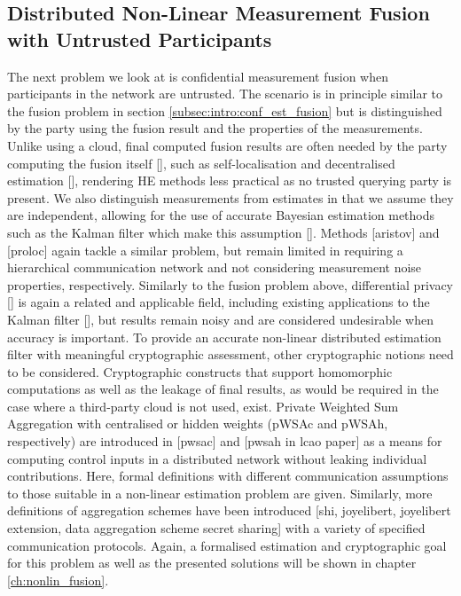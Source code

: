 % 
% 

\subsection{Distributed Non-Linear Measurement Fusion with Untrusted Participants}\label{subsec:intro:conf_nonlin_measurements}
The next problem we look at is confidential measurement fusion when participants in the network are untrusted. The scenario is in principle similar to the fusion problem in section \ref{subsec:intro:conf_est_fusion} but is distinguished by the party using the fusion result and the properties of the measurements. Unlike using a cloud, final computed fusion results are often needed by the party computing the fusion itself [], such as self-localisation and decentralised estimation [], rendering HE methods less practical as no trusted querying party is present. We also distinguish measurements from estimates in that we assume they are independent, allowing for the use of accurate Bayesian estimation methods such as the Kalman filter which make this assumption []. Methods [aristov] and [proloc] again tackle a similar problem, but remain limited in requiring a hierarchical communication network and not considering measurement noise properties, respectively. Similarly to the fusion problem above, differential privacy [] is again a related and applicable field, including existing applications to the Kalman filter [], but results remain noisy and are considered undesirable when accuracy is important. To provide an accurate non-linear distributed estimation filter with meaningful cryptographic assessment, other cryptographic notions need to be considered. Cryptographic constructs that support homomorphic computations as well as the leakage of final results, as would be required in the case where a third-party cloud is not used, exist. Private Weighted Sum Aggregation with centralised or hidden weights (pWSAc and pWSAh, respectively) are introduced in [pwsac] and [pwsah in lcao paper] as a means for computing control inputs in a distributed network without leaking individual contributions. Here, formal definitions with different communication assumptions to those suitable in a non-linear estimation problem are given. Similarly, more definitions of aggregation schemes have been introduced [shi, joyelibert, joyelibert extension, data aggregation scheme secret sharing] with a variety of specified communication protocols. Again, a formalised estimation and cryptographic goal for this problem as well as the presented solutions will be shown in chapter \ref{ch:nonlin_fusion}.

